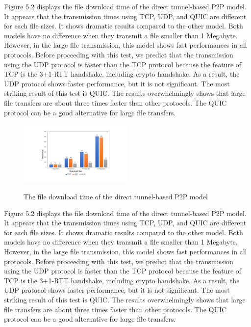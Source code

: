Figure 5.2 displays the file download time of the direct tunnel-based P2P model. It appears that the transmission times using TCP, UDP, and QUIC are different for each file sizes. It shows dramatic results compared to the other model. Both models have no difference when they transmit a file smaller than 1 Megabyte. However, in the large file transmission, this model shows fast performances in all protocols. Before proceeding with this test, we predict that the transmission using the UDP protocol is faster than the TCP protocol because the feature of TCP is the 3+1-RTT handshake, including crypto handshake. As a result, the UDP protocol shows faster performance, but it is not significant. The most striking result of this test is QUIC. The results  overwhelmingly shows that large file transfers are about three times faster than other protocols. The QUIC protocol can be a good alternative for large file transfers.

\begin{figure}[!ht]
	\centering
	\includegraphics[width=0.5\textwidth]{images/fig_5_2.pdf}\\
	\caption{The file download time of the direct tunnel-based P2P model}
	\label{fig:t_download}
\end{figure}

Figure 5.2 displays the file download time of the direct tunnel-based P2P model. It appears that the transmission times using TCP, UDP, and QUIC are different for each file sizes. It shows dramatic results compared to the other model. Both models have no difference when they transmit a file smaller than 1 Megabyte. However, in the large file transmission, this model shows fast performances in all protocols. Before proceeding with this test, we predict that the transmission using the UDP protocol is faster than the TCP protocol because the feature of TCP is the 3+1-RTT handshake, including crypto handshake. As a result, the UDP protocol shows faster performance, but it is not significant. The most striking result of this test is QUIC. The results  overwhelmingly shows that large file transfers are about three times faster than other protocols. The QUIC protocol can be a good alternative for large file transfers.

